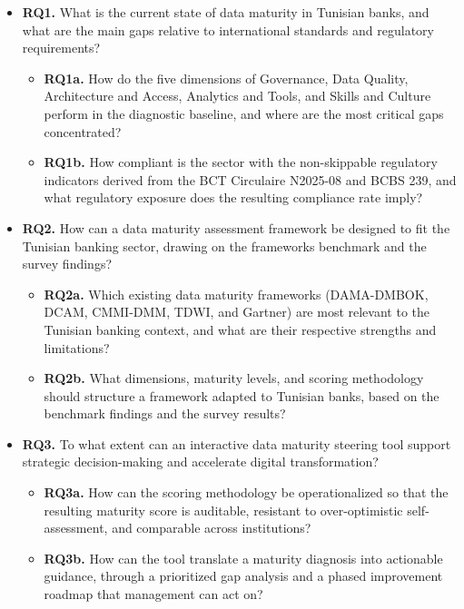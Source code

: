 \begin{itemize}[leftmargin=*]
    \item \textbf{RQ1.} What is the current state of data maturity in Tunisian banks, and what are the main gaps relative to international standards and regulatory requirements?
    \begin{itemize}[leftmargin=*]
        \item \textbf{RQ1a.} How do the five dimensions of Governance, Data Quality, Architecture and Access, Analytics and Tools, and Skills and Culture perform in the diagnostic baseline, and where are the most critical gaps concentrated?
        \item \textbf{RQ1b.} How compliant is the sector with the non-skippable regulatory indicators derived from the BCT Circulaire N\textdegree{}2025-08 and BCBS 239, and what regulatory exposure does the resulting compliance rate imply?
    \end{itemize}
    \item \textbf{RQ2.} How can a data maturity assessment framework be designed to fit the Tunisian banking sector, drawing on the frameworks benchmark and the survey findings?
    \begin{itemize}[leftmargin=*]
        \item \textbf{RQ2a.} Which existing data maturity frameworks (DAMA-DMBOK, DCAM, CMMI-DMM, TDWI, and Gartner) are most relevant to the Tunisian banking context, and what are their respective strengths and limitations?
        \item \textbf{RQ2b.} What dimensions, maturity levels, and scoring methodology should structure a framework adapted to Tunisian banks, based on the benchmark findings and the survey results?
    \end{itemize}
    \item \textbf{RQ3.} To what extent can an interactive data maturity steering tool support strategic decision-making and accelerate digital transformation?
    \begin{itemize}[leftmargin=*]
        \item \textbf{RQ3a.} How can the scoring methodology be operationalized so that the resulting maturity score is auditable, resistant to over-optimistic self-assessment, and comparable across institutions?
        \item \textbf{RQ3b.} How can the tool translate a maturity diagnosis into actionable guidance, through a prioritized gap analysis and a phased improvement roadmap that management can act on?
    \end{itemize}
\end{itemize}


